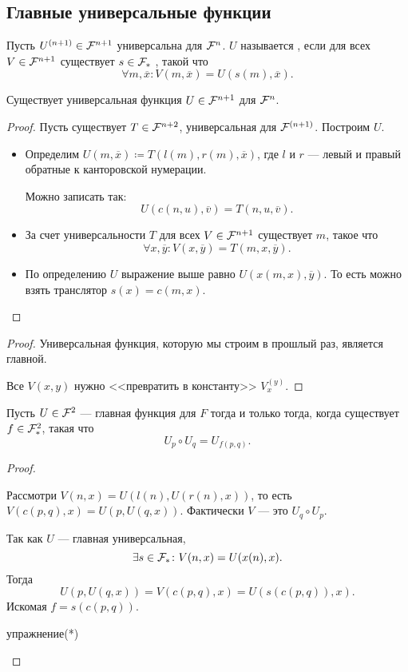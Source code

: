 
\subsection{Главные универсальные функции}
\begin{defn}[]
	Пусть $ U^{(n+1)} \in \mathcal{F}^{n+1}$ универсальна для $ \mathcal{F}^{n}$. $U$ называется , если для всех $   V \in \mathcal{F}^{n+1}$  существует  $ s \in \mathcal{F}_{*}$ , такой что 
	\[
		\forall m, \overline{x}\colon V(m, \overline{x}) = U(s(m), \overline{x}) 
	.\] 
\end{defn}


\begin{thm}
    Существует универсальная функция $ U \in \mathcal{F}^{n+1} $ для $ \mathcal{F}^{n}$.
\end{thm}
\begin{proof}
	Пусть существует $ T \in \mathcal{F}^{n+2}$, универсальная для $ \mathcal{F}^{(n+1)}$. Построим $ U$.
	\begin{itemize}
		\item Определим $ U(m, \overline{x}) \coloneqq T(l(m), r(m), \overline{x})$, где $ l $ и $ r$ --- левый и правый обратные к канторовской нумерации.
			
			Можно  записать так:
			\[
				U(c(n, u), \overline{v}) = T(n, u, \overline{v})
			.\] 
		\item За счет универсальности $ T $ для всех $ V \in \mathcal{F}^{n+1}$ существует $ m$, такое что
			\[
				\forall x, \overline{y}\colon V(x, \overline{y}) = T(m, x, \overline{y})
			.\] 
		\item 
			По определению $ U$ выражение выше равно $ U(x(m, x), \overline{y})$. То есть можно взять транслятор $ s(x) = c(m, x)$.
	\end{itemize}
\end{proof}
\begin{proof}
    Универсальная функция, которую мы строим в прошлый раз, является главной.

	Все $ V(x, y)$ нужно <<превратить в константу>> $ V_{x}^{(y)}$.
\end{proof}


\begin{thm}
    Пусть $ U \in \mathcal{F}^2 $ --- главная функция для $ F$ тогда и только тогда, когда существует $ f \in \mathcal{F}^2_{*}$, такая что
	\[
		U_p \circ U_q = U_{f(p, q)}
	.\] 
\end{thm}
\begin{proof}
    ~\begin{description}
        \item {} 
			Рассмотри $ V(n, x) = U(l(n), U(r(n), x))$, то есть  $ V(c(p, q), x) = U(p, U(q, x))$. Фактически $ V$ --- это $ U_q \circ U_p$.

			Так как $ U$ --- главная универсальная, 
			\[
				\exists s \in \mathcal{F}_{*} \colon V(n, x)  = U(x(n), x)
			.\] 
			Тогда
			\[
				U(p, U(q, x)) = V(c(p, q), x) = U(s(c(p, q)), x)
			.\] 
			Искомая $ f = s(c(p, q))$.
        \item {} 
			упражнение(*)
    \end{description} 
\end{proof}



